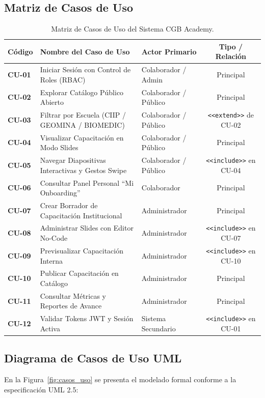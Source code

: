 \documentclass[11pt,a4paper]{article}
\begin{document}
\subsection{Matriz de Casos de Uso}
\begin{table}[H]
    \centering
    \small
    \begin{tabularx}{\textwidth}{l X l c}
        \toprule
        \textbf{Código} & \textbf{Nombre del Caso de Uso} & \textbf{Actor Primario} & \textbf{Tipo / Relación} \\
        \midrule
        \textbf{CU-01} & Iniciar Sesión con Control de Roles (RBAC) & Colaborador / Admin & Principal \\
        \textbf{CU-02} & Explorar Catálogo Público Abierto & Colaborador / Público & Principal \\
        \textbf{CU-03} & Filtrar por Escuela (CIIP / GEOMINA / BIOMEDIC) & Colaborador / Público & \texttt{<<extend>>} de CU-02 \\
        \textbf{CU-04} & Visualizar Capacitación en Modo Slides & Colaborador / Público & Principal \\
        \textbf{CU-05} & Navegar Diapositivas Interactivas y Gestos Swipe & Colaborador / Público & \texttt{<<include>>} en CU-04 \\
        \textbf{CU-06} & Consultar Panel Personal ``Mi Onboarding'' & Colaborador & Principal \\
        \textbf{CU-07} & Crear Borrador de Capacitación Institucional & Administrador & Principal \\
        \textbf{CU-08} & Administrar Slides con Editor No-Code & Administrador & \texttt{<<include>>} en CU-07 \\
        \textbf{CU-09} & Previsualizar Capacitación Interna & Administrador & \texttt{<<include>>} en CU-10 \\
        \textbf{CU-10} & Publicar Capacitación en Catálogo & Administrador & Principal \\
        \textbf{CU-11} & Consultar Métricas y Reportes de Avance & Administrador & Principal \\
        \textbf{CU-12} & Validar Tokens JWT y Sesión Activa & Sistema Secundario & \texttt{<<include>>} en CU-01 \\
        \bottomrule
    \end{tabularx}
    \caption{Matriz de Casos de Uso del Sistema CGB Academy.}
    \label{tab:casos_uso}
\end{table}

\subsection{Diagrama de Casos de Uso UML}
En la Figura~\ref{fig:casos_uso} se presenta el modelado formal conforme a la especificación UML 2.5:
\end{document}
